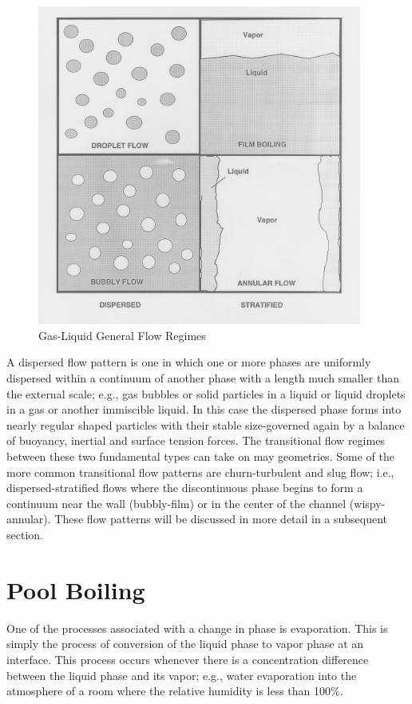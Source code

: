 \begin{figure}[h]
\includegraphics[width=0.95\textwidth]{images/general_flow_regime_map.png}
\caption{Gas-Liquid General Flow Regimes}
\label{fig:flow_regime_map}
\end{figure}

A dispersed flow pattern is one in which one or more phases are uniformly dispersed within a continuum of another phase with a length much smaller than the external scale; e.g., gas bubbles or solid particles in a liquid or liquid droplets in a gas or another immiscible liquid.
In this case the dispersed phase forms into nearly regular shaped particles with their stable size-governed again by a balance of buoyancy, inertial and surface tension forces.
The transitional flow regimes between these two fundamental types can take on may geometries.
Some of the more common transitional flow patterns are churn-turbulent and slug flow; i.e., dispersed-stratified flows where the discontinuous phase begins to form a continuum near the wall (bubbly-film) or in the center of the channel (wispy-annular).
These flow patterns will be discussed in more detail in a subsequent section.

\section{Pool Boiling}

One of the processes associated with a change in phase is evaporation.
This is simply the process of conversion of the liquid phase to vapor phase at an interface.
This process occurs whenever there is a concentration difference between the liquid phase and its vapor; e.g., water evaporation into the atmosphere of a room where the relative humidity is less than 100\%.


